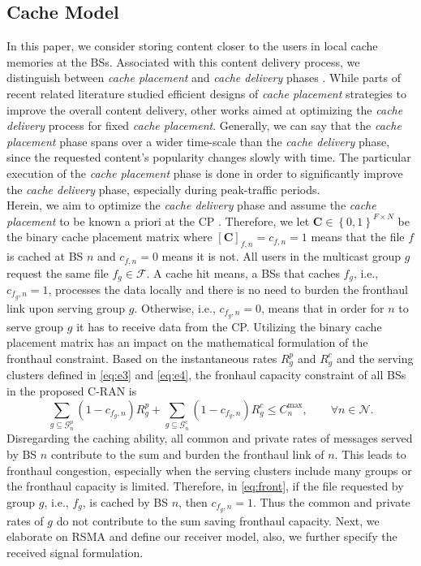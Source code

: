 \documentclass[12pt,draftcls,onecolumn]{IEEEtran}
\theoremstyle{remark}
\theoremstyle{definition}
\begin{document}
\subsection{Cache Model}
In this paper, we consider storing content closer to the users in local cache memories at the BSs. Associated with this content delivery process, we distinguish between \textit{cache placement} and \textit{cache delivery} phases \cite{8008769,6763007}.
While parts of recent related literature studied efficient designs of \textit{cache placement} strategies to improve the overall content delivery, other works aimed at optimizing the \textit{cache delivery} process for fixed \textit{cache placement}. Generally, we can say that the \textit{cache placement} phase spans over a wider time-scale than the \textit{cache delivery} phase, since the requested content's popularity changes slowly with time. The particular execution of the \textit{cache placement} phase is done in order to significantly improve the \textit{cache delivery} phase, especially during peak-traffic periods.\\
\indent Herein, we aim to optimize the \textit{cache delivery} phase and assume the \textit{cache placement} to be known a priori at the CP \cite{7499119}. Therefore, we let $\mathbf{C} \in \left\lbrace 0,1\right\rbrace^{F \times N} $ be the binary cache placement matrix where $\left[\mathbf{C}\right]_{f, n} = c_{f, n} = 1 $ means that the file $f$ is cached at BS $n$ and $c_{f, n} = 0$ means it is not. All users in the multicast group $g$ request the same file $f_g \in \mathcal{F}$. A cache hit means, a BSs that caches $f_g$, i.e., $c_{f_g, n} = 1$, processes the data locally and there is no need to burden the fronthaul link upon serving group $g$. Otherwise, i.e., $c_{f_g, n} = 0 $, means that in order for $n$ to serve group $g$ it has to receive data from the CP.
Utilizing the binary cache placement matrix has an impact on the mathematical formulation of the fronthaul constraint. Based on the instantaneous rates $R_g^p$ and $R_g^c$ and the serving clusters defined in \eqref{eq:e3} and \eqref{eq:e4}, the fronhaul capacity constraint of all BSs in the proposed C-RAN is
\begin{equation}
	\sum_{{g \subseteq \mathcal{G}_n^p}}(1-c_{f_g, n}){R}_{g}^{p} + \sum_{{g \subseteq \mathcal{G}_n^c}} (1-c_{f_g, n}) {R}_{g}^{c} \leq C_n^{\text{max}}, \qquad \forall n \in \mathcal{N}. \label{eq:front}
\end{equation}
Disregarding the caching ability, all common and private rates of messages served by BS $n$ contribute to the sum and burden the fronthaul link of $n$. This leads to fronthaul congestion, especially when the serving clusters include many groups or the fronthaul capacity is limited. Therefore, in \eqref{eq:front}, if the file requested by group $g$, i.e., $f_g$, is cached by BS $n$, then $c_{f_g,n} = 1$. Thus the common and private rates of $g$ do not contribute to the sum saving fronthaul capacity. Next, we elaborate on RSMA and define our receiver model, also, we further specify the received signal formulation.
\end{document}
